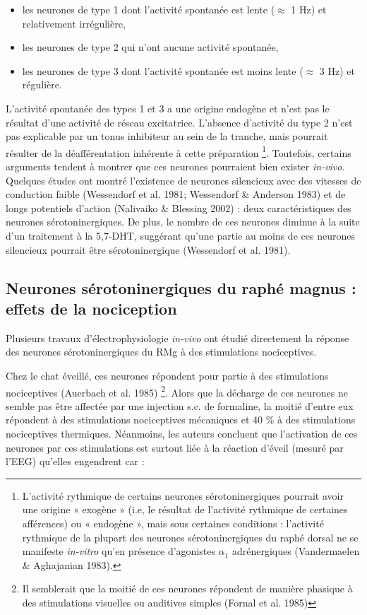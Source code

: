 \documentclass[a4paper,12pt,twoside]{report}
\begin{document}
\begin{itemize}
\item les neurones de type 1 dont l’activité spontanée est lente ($\approx$ 1 Hz) et relativement irrégulière,
\item les neurones de type 2 qui n’ont aucune activité spontanée,
\item les neurones de type 3 dont l’activité spontanée est moins lente ($\approx$ 3 Hz) et régulière.
\end{itemize}

L’activité spontanée des types 1 et 3 a une origine endogène et n’est pas le résultat d’une activité de réseau excitatrice. L’absence d’activité du type 2 n’est pas explicable par un tonus inhibiteur au sein de la tranche, mais pourrait résulter de la déafférentation inhérente à cette préparation
\footnote{L’activité rythmique de certains neurones sérotoninergiques pourrait avoir une origine « exogène » (i.e, le résultat de l’activité rythmique de certaines afférences) ou « endogène », mais sous certaines conditions : l’activité rythmique de la plupart des neurones sérotoninergiques du raphé dorsal ne se manifeste \textit{in-vitro} qu’en présence d’agonistes $\alpha_{1}$ adrénergiques (Vandermaelen \& Aghajanian 1983).}. 
Toutefois, certains arguments tendent à montrer que ces neurones pourraient bien exister \textit{in-vivo}. Quelques études ont montré l’existence de neurones silencieux avec des vitesses de conduction faible (Wessendorf et al. 1981; Wessendorf \& Anderson 1983) et de longs potentiels d’action (Nalivaiko \& Blessing 2002) : deux caractéristiques des neurones sérotoninergiques. De plus, le nombre de ces neurones diminue à la suite d’un traitement à la 5,7-DHT, suggérant qu’une partie au moins de ces neurones silencieux pourrait être sérotoninergique (Wessendorf et al. 1981).

\subsection{Neurones sérotoninergiques du raphé magnus : effets de la nociception}
\label{Neurones 5-HT du RMg : effets de la nociception}

Plusieurs travaux d’électrophysiologie \textit{in-vivo} ont étudié directement la réponse des neurones sérotoninergiques du RMg à des stimulations nociceptives.

Chez le chat éveillé, ces neurones répondent pour partie à des stimulations nociceptives (Auerbach et al. 1985)
\footnote{Il semblerait que la moitié de ces neurones répondent de manière phasique à des stimulations visuelles ou auditives simples (Fornal et al. 1985)}. 
Alors que la décharge de ces neurones ne semble pas être affectée par une injection s.c. de formaline, la moitié d’entre eux répondent à des stimulations nociceptives mécaniques et 40 \% à des stimulations nociceptives thermiques. Néanmoins, les auteurs concluent que l’activation de ces neurones par ces stimulations est surtout liée à la réaction d’éveil (mesuré par l’EEG) qu’elles engendrent car :
\end{document}
